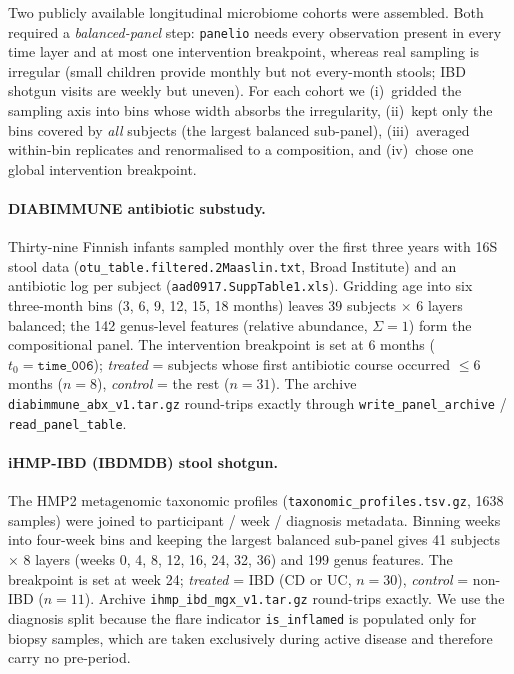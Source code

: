 \documentclass[11pt]{article}
\begin{document}
Two publicly available longitudinal microbiome cohorts were assembled. Both required a
\emph{balanced-panel} step: \texttt{panelio} needs every observation present in every time layer and
at most one intervention breakpoint, whereas real sampling is irregular (small children provide
monthly but not every-month stools; IBD shotgun visits are weekly but uneven). For each cohort we
(i)~gridded the sampling axis into bins whose width absorbs the irregularity, (ii)~kept only the bins
covered by \emph{all} subjects (the largest balanced sub-panel), (iii)~averaged within-bin replicates
and renormalised to a composition, and (iv)~chose one global intervention breakpoint.

\paragraph{DIABIMMUNE antibiotic substudy.}
Thirty-nine Finnish infants sampled monthly over the first three years with 16S stool data
(\texttt{otu\_table.filtered.2Maaslin.txt}, Broad Institute) and an antibiotic log per subject
(\texttt{aad0917.SuppTable1.xls}). Gridding age into six three-month bins (3, 6, 9, 12, 15, 18
months) leaves 39 subjects $\times$ 6 layers balanced; the 142 genus-level features (relative
abundance, $\Sigma=1$) form the compositional panel. The intervention breakpoint is set at 6 months
($t_0=\texttt{time\_006}$); \emph{treated} = subjects whose first antibiotic course occurred
$\le 6$ months ($n=8$), \emph{control} = the rest ($n=31$). The archive
\texttt{diabimmune\_abx\_v1}\allowbreak\texttt{.tar.gz} round-trips exactly through \texttt{write\_panel\_archive} /
\texttt{read\_panel\_table}.

\paragraph{iHMP-IBD (IBDMDB) stool shotgun.}
The HMP2 metagenomic taxonomic profiles (\texttt{taxonomic\_profiles}\allowbreak\texttt{.tsv.gz}, 1638 samples) were
joined to participant / week / diagnosis metadata. Binning weeks into four-week bins and keeping the
largest balanced sub-panel gives 41 subjects $\times$ 8 layers (weeks 0, 4, 8, 12, 16, 24, 32, 36) and
199 genus features. The breakpoint is set at week 24; \emph{treated} = IBD (CD or UC, $n=30$),
\emph{control} = non-IBD ($n=11$). Archive \texttt{ihmp\_ibd\_mgx\_v1}\allowbreak\texttt{.tar.gz} round-trips exactly.
We use the diagnosis split because the flare indicator \texttt{is\_inflamed} is populated only for
biopsy samples, which are taken exclusively during active disease and therefore carry no pre-period.
\end{document}
